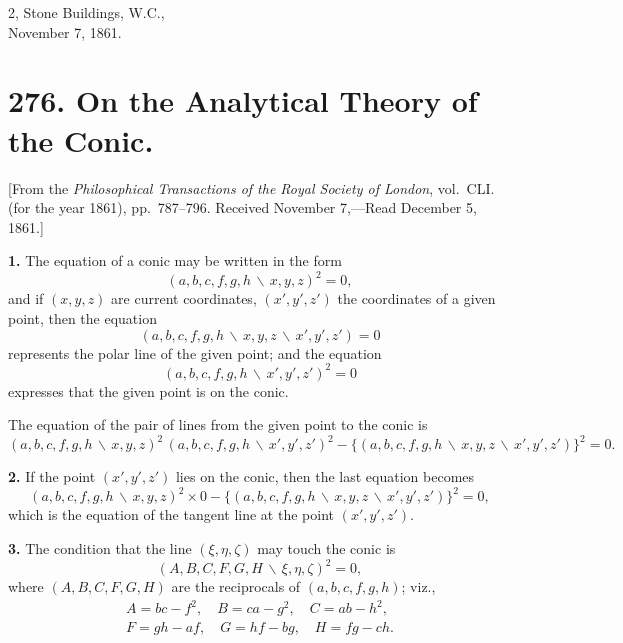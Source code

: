 \documentclass[11pt,a4paper]{book}
\begin{document}
\begin{flushright}
2, Stone Buildings, W.C.,\\
November 7, 1861.
\end{flushright}

\newpage
\section*{276. On the Analytical Theory of the Conic.}

[From the \textit{Philosophical Transactions of the Royal Society of London},
vol.~CLI. (for the year 1861), pp.~787--796.
Received November 7,---Read December 5, 1861.]
\vspace{0.5em}

\textbf{1.} The equation of a conic may be written in the form
\[(a,b,c,f,g,h\,\backslash\!\!\,x,y,z)^{2} = 0,\]
and if $(x,y,z)$ are current coordinates, $(x',y',z')$ the coordinates of a given point,
then the equation
\[(a,b,c,f,g,h\,\backslash\!\!\,x,y,z\,\backslash\!\!\,x',y',z') = 0\]
represents the polar line of the given point; and the equation
\[(a,b,c,f,g,h\,\backslash\!\!\,x',y',z')^{2} = 0\]
expresses that the given point is on the conic.

The equation of the pair of lines from the given point to the conic is
\[(a,b,c,f,g,h\,\backslash\!\!\,x,y,z)^{2}\,(a,b,c,f,g,h\,\backslash\!\!\,x',y',z')^{2}
- \{(a,b,c,f,g,h\,\backslash\!\!\,x,y,z\,\backslash\!\!\,x',y',z')\}^{2} = 0.\]

\textbf{2.} If the point $(x',y',z')$ lies on the conic, then the last equation becomes
\[(a,b,c,f,g,h\,\backslash\!\!\,x,y,z)^{2}\times 0 - \{(a,b,c,f,g,h\,\backslash\!\!\,x,y,z\,\backslash\!\!\,x',y',z')\}^{2} = 0,\]
which is the equation of the tangent line at the point $(x',y',z')$.

\textbf{3.} The condition that the line $(\xi,\eta,\zeta)$ may touch the conic is
\[(A,B,C,F,G,H\,\backslash\!\!\,\xi,\eta,\zeta)^{2} = 0,\]
where $(A,B,C,F,G,H)$ are the reciprocals of $(a,b,c,f,g,h)$; viz.,
\begin{gather*}
A = bc-f^{2}, \quad B = ca-g^{2}, \quad C = ab-h^{2},\\
F = gh-af, \quad G = hf-bg, \quad H = fg-ch.
\end{gather*}
\end{document}
